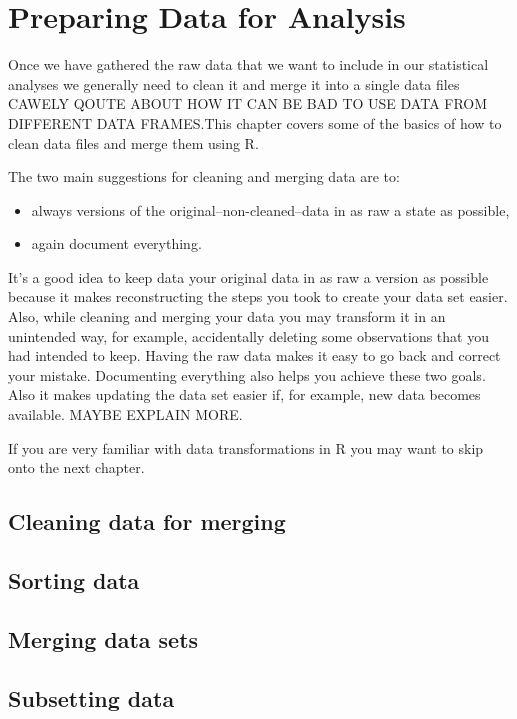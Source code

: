 



\chapter{Preparing Data for Analysis}\label{DataClean}

Once we have gathered the raw data that we want to include in our statistical analyses we generally need to clean it and merge it into a single data files CAWELY QOUTE ABOUT HOW IT CAN BE BAD TO USE DATA FROM DIFFERENT DATA FRAMES.This chapter covers some of the basics of how to clean data files and merge them using R. 

The two main suggestions for cleaning and merging data are to:

\begin{itemize}
    \item always versions of the original--non-cleaned--data in as raw a state as possible,
    \item again document everything.
\end{itemize}

It's a good idea to keep data your original data in as raw a version as possible because it makes reconstructing the steps you took to create your data set easier. Also, while cleaning and merging your data you may transform it in an unintended way, for example, accidentally deleting some observations that you had intended to keep. Having the raw data makes it easy to go back and correct your mistake. Documenting everything also helps you achieve these two goals. Also it makes updating the data set easier if, for example, new data becomes available. MAYBE EXPLAIN MORE.

If you are very familiar with data transformations in R you may want to skip onto the next chapter. 

\section{Cleaning data for merging}

\section{Sorting data}

\section{Merging data sets}

\section {Subsetting data}
